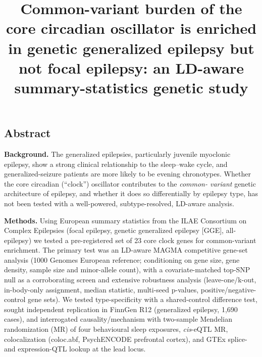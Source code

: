 \documentclass[
]{article}
\title{Common-variant burden of the core circadian oscillator is
enriched in genetic generalized epilepsy but not focal epilepsy: an
LD-aware summary-statistics genetic study}
\author{}
\date{}
\begin{document}
\maketitle

\subsection{Abstract}\label{abstract}

\textbf{Background.} The generalized epilepsies, particularly juvenile
myoclonic epilepsy, show a strong clinical relationship to the
sleep--wake cycle, and generalized-seizure patients are more likely to
be evening chronotypes. Whether the core circadian (``clock'')
oscillator contributes to the \emph{common- variant} genetic
architecture of epilepsy, and whether it does so differentially by
epilepsy type, has not been tested with a well-powered,
subtype-resolved, LD-aware analysis.

\textbf{Methods.} Using European summary statistics from the ILAE
Consortium on Complex Epilepsies (focal epilepsy, genetic generalized
epilepsy {[}GGE{]}, all-epilepsy) we tested a pre-registered set of 23
core clock genes for common-variant enrichment. The primary test was an
LD-aware MAGMA competitive gene-set analysis (1000 Genomes European
reference; conditioning on gene size, gene density, sample size and
minor-allele count), with a covariate-matched top-SNP null as a
corroborating screen and extensive robustness analysis
(leave-one/\hspace{0pt}k-out, in-body-only assignment, median statistic,
multi-seed p-values, positive/negative-control gene sets). We tested
type-specificity with a shared-control difference test, sought
independent replication in FinnGen R12 (generalized epilepsy, 1,690
cases), and interrogated causality/mechanism with two-sample Mendelian
randomization (MR) of four behavioural sleep exposures, \emph{cis}-eQTL
MR, colocalization (coloc.abf, PsychENCODE prefrontal cortex), and GTEx
splice- and expression-QTL lookup at the lead locus.
\end{document}
